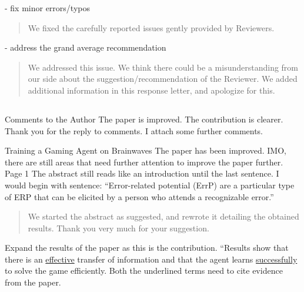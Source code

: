 \documentclass[journal,onecolumn,12pt]{IEEEtran}
\begin{document}
- fix minor errors/typos

\begin{quotation}
{\color{blue}
We fixed the carefully reported issues gently provided by Reviewers.
}
\end{quotation}

- address the grand average recommendation

\begin{quotation}
{\color{blue}
We addressed this issue.  We think there could be a misunderstanding from our side about the suggestion/recommendation of the Reviewer.  We added additional information in this response letter, and apologize for this.
}
\end{quotation}

\subsection*{}

Comments to the Author
The paper is improved. The contribution is clearer. Thank you for the reply to comments. I attach some further comments.

Training a Gaming Agent on Brainwaves
The paper has been improved. IMO, there are still areas that need further attention to improve the paper further.
Page 1
The abstract still reads like an introduction until the last sentence.  I would begin with sentence: “Error-related potential (ErrP) are a particular type of ERP that can be elicited by a person who attends a recognizable error.”

\begin{quotation}
{\color{blue}
We started the abstract as suggested, and rewrote it detailing the obtained results.   Thank you very much for your suggestion.
}
\end{quotation}


Expand the results of the paper as this is the contribution.
“Results show that there is an  \underline{effective} transfer of information and that the agent learns \underline{successfully} to solve the game efficiently.
Both the underlined terms need to cite evidence from the paper.
\end{document}
